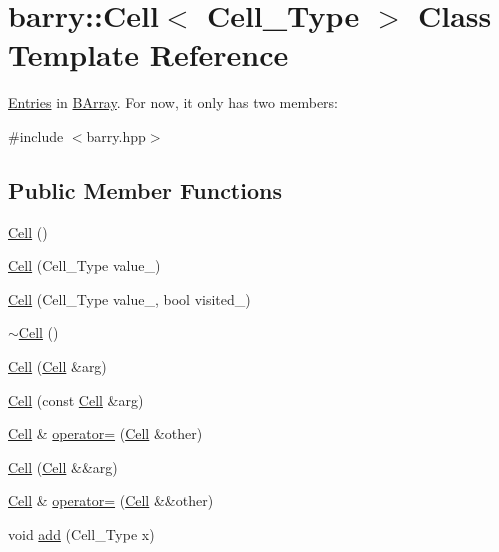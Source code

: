 \hypertarget{classbarry_1_1_cell}{}\section{barry\+:\+:Cell$<$ Cell\+\_\+\+Type $>$ Class Template Reference}
\label{classbarry_1_1_cell}


\hyperlink{classbarry_1_1_entries}{Entries} in \hyperlink{classbarry_1_1_b_array}{B\+Array}. For now, it only has two members\+:  




{\ttfamily \#include $<$barry.\+hpp$>$}

\subsection*{Public Member Functions}
\begin{DoxyCompactItemize}
\item 
\hyperlink{classbarry_1_1_cell_aa7beee933fc291cbc4ac84ec3ab63352}{Cell} ()
\item 
\hyperlink{classbarry_1_1_cell_a228ee63eccb0250954f7540a8b946c78}{Cell} (Cell\+\_\+\+Type value\+\_\+)
\item 
\hyperlink{classbarry_1_1_cell_a421e81ef4364c2d8f2c27a291d4bc830}{Cell} (Cell\+\_\+\+Type value\+\_\+, bool visited\+\_\+)
\item 
\hyperlink{classbarry_1_1_cell_a2500924b447d4d881916749041974d81}{$\sim$\+Cell} ()
\item 
\hyperlink{classbarry_1_1_cell_a5768e9495f6d7570fdbadf362bc46e3a}{Cell} (\hyperlink{classbarry_1_1_cell}{Cell} \&arg)
\item 
\hyperlink{classbarry_1_1_cell_a5db94e6e2ad797d4e9b41e73a3a94e32}{Cell} (const \hyperlink{classbarry_1_1_cell}{Cell} \&arg)
\item 
\hyperlink{classbarry_1_1_cell}{Cell} \& \hyperlink{classbarry_1_1_cell_a2a23ba83119de9162b6e3b6a994f4b61}{operator=} (\hyperlink{classbarry_1_1_cell}{Cell} \&other)
\item 
\hyperlink{classbarry_1_1_cell_a56d2ab8f2a26b1fd8f3b3b9bfef37c1b}{Cell} (\hyperlink{classbarry_1_1_cell}{Cell} \&\&arg)
\item 
\hyperlink{classbarry_1_1_cell}{Cell} \& \hyperlink{classbarry_1_1_cell_ac0f00c52254617f8e4ba9d03ddf5b890}{operator=} (\hyperlink{classbarry_1_1_cell}{Cell} \&\&other)
\item 
void \hyperlink{classbarry_1_1_cell_a40c9aad3ba2c9d5a1a91833c66522ad8}{add} (Cell\+\_\+\+Type x)
\end{DoxyCompactItemize}
